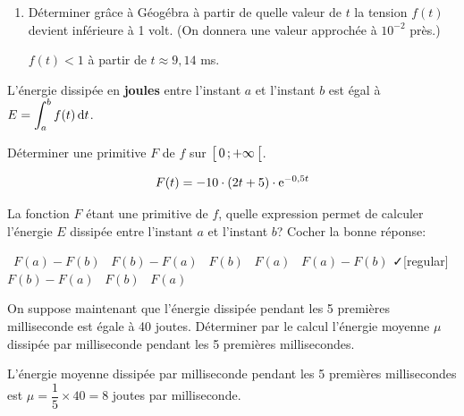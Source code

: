 \medskip


\begin{enumerate}[series=monDS, resume]
     
   \item Déterminer grâce à Géogébra à partir de quelle valeur de $t$ la tension $f(t)$ devient inférieure à 1 volt. (On donnera une valeur approchée à $10^{-2}$ près.)
    \begin{blocvisiblex}[height=1]
    {\quad}
    $f(t)<1$ à partir de $t\approx 9,14$ ms.
    \end{blocvisiblex}
\end{enumerate}

L'énergie dissipée en \textbf{joules} entre l'instant $a$ et l'instant $b$ est égal à $E=\displaystyle \int_{a}^{b} f(t) \,\mathrm{d}t$.

\begin{enumerate}[series=monDS, resume]
    \begin{minipage}{0.46\textwidth}
            \item Déterminer une primitive $F$ de $f$ sur $\bigl[ \, 0 \, ; +\infty \,\bigl[$.
    \end{minipage}\hfill{}
    \begin{minipage}{0.46\textwidth}
        \begin{blocvisiblex}[height=1.2]
    {\quad}

    \[F(t)=-10\cdot (2t+5)\cdot \mathrm{e}^{-0,5t}\]
    \end{blocvisiblex}
    \end{minipage}
    
    \medskip

    \item La fonction $F$ étant une primitive de $f$, quelle expression permet de calculer l'énergie $E$ dissipée entre l'instant $a$ et l'instant $b$? Cocher la bonne réponse:
   \begin{blocvisiblex}[height=1]
    {
    \faSquare[regular] \, $F(a) - F(b)$ \hfill \faSquare[regular] \, $F(b) - F(a)$ \hfill \faSquare[regular] \, $F(b)$ \hfill \faSquare[regular] \, $F(a)$ \hspace{1cm} 
 }         
    \faSquare[regular] \, $F(a) - F(b)$ \hfill \faCheck[regular] \, $F(b) - F(a)$ \hfill \faSquare[regular] \, $F(b)$ \hfill \faSquare[regular] \, $F(a)$ \hspace{1cm} 
    \end{blocvisiblex}
    \medskip
\item On suppose maintenant que l'énergie dissipée pendant les 5 premières milliseconde est égale à 40 joutes. Déterminer par le calcul l'énergie moyenne $\mu$ dissipée par milliseconde pendant les 5 premières millisecondes.
    \begin{blocvisiblex}[height=3]
    {\quad}
    L'énergie moyenne dissipée par milliseconde pendant les 5 premières millisecondes est $\mu=\dfrac{1}{5} \times 40=8$ joutes par milliseconde.
    \end{blocvisiblex}
    \medskip
    
\end{enumerate}
    

